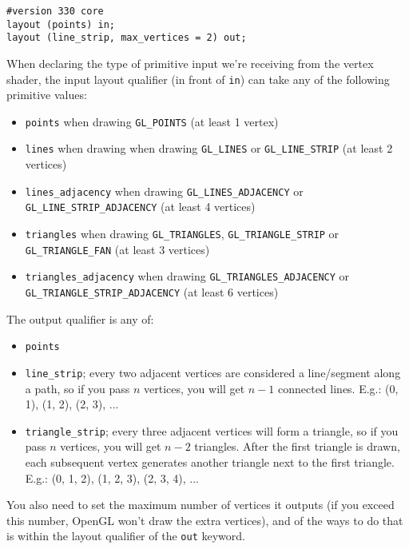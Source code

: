 \documentclass[8pt, table, xcdraw]{article}%
\begin{document}
\begin{enumerate}
    \begin{lstlisting}
#version 330 core
layout (points) in;
layout (line_strip, max_vertices = 2) out;
    \end{lstlisting}

    When declaring the type of primitive input we're receiving from the vertex shader, the input layout qualifier (in front of \lstinline{in}) can take any of the following primitive values:

    \begin{itemize}
        \item \lstinline{points} when drawing \lstinline{GL_POINTS} (at least 1 vertex)
        \item \lstinline{lines} when drawing when drawing \lstinline{GL_LINES} or \lstinline{GL_LINE_STRIP} (at least 2 vertices)
        \item \lstinline{lines_adjacency} when drawing \lstinline{GL_LINES_ADJACENCY} or \lstinline{GL_LINE_STRIP_ADJACENCY} (at least 4 vertices)
        \item \lstinline{triangles} when drawing \lstinline{GL_TRIANGLES}, \lstinline{GL_TRIANGLE_STRIP} or \lstinline{GL_TRIANGLE_FAN} (at least 3 vertices)
        \item \lstinline{triangles_adjacency} when drawing \lstinline{GL_TRIANGLES_ADJACENCY} or \lstinline{GL_TRIANGLE_STRIP_ADJACENCY} (at least 6 vertices)
    \end{itemize}

    The output qualifier is any of:
    
    \begin{itemize}
        \item \lstinline{points}
        \item \lstinline{line_strip}; every two adjacent vertices are considered a line/segment along a path, so if you pass $n$ vertices, you will get $n-1$ connected lines. E.g.: (0, 1), (1, 2), (2, 3), ...
        \item \lstinline{triangle_strip}; every three adjacent vertices will form a triangle, so if you pass $n$ vertices, you will get $n-2$ triangles. After the first triangle is drawn, each subsequent vertex generates another triangle next to the first triangle. E.g.: (0, 1, 2), (1, 2, 3), (2, 3, 4), ...
    \end{itemize}

    You also need to set the maximum number of vertices it outputs (if you exceed this number, OpenGL won't draw the extra vertices), and of the ways to do that is within the layout qualifier of the \lstinline{out} keyword.


\end{enumerate}
\end{document}
